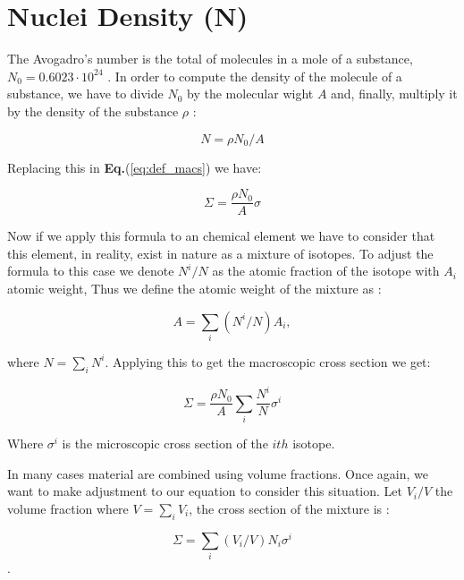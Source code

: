 \section{Nuclei Density (N)}

The Avogadro's number is the total of molecules in a mole of a substance, $N_0 = 0.6023 \cdot 10^24$ \cite{Lewis_2014}. In order to compute the  density of the molecule of a substance, we have to divide $N_0$ by the molecular wight \(A\) and, finally, multiply it by the density of the substance \(\rho\) \cite{Lewis_2014}:

\begin{equation*}
    N = \rho N_{0}/A
\end{equation*}

Replacing this in \textbf{Eq.}(\ref{eq:def_macs}) we have:

\begin{equation*}
    \Sigma = \frac{\rho N_{0}}{A}\sigma
\end{equation*}

Now if we apply this formula to an chemical element we have to consider that this element, in reality, exist in nature as a mixture of isotopes. To adjust the formula to this case we denote $N^{i}/N$ as the atomic fraction of the isotope with $A_i$ atomic weight, Thus we define the atomic weight of the mixture as \cite{Lewis_2014}:

\begin{equation*}
    A = \sum_{i} (N^{i}/N) A_{i} ,
\end{equation*}

where $N = \sum_{i}N^{i}$. Applying this to get the macroscopic cross section we get:

\begin{equation}
    \Sigma = \frac{\rho N_{0}}{A} \sum_{i}\frac{N^{i}}{N} \sigma^{i}
    \label{eq:chemical_mcs}
\end{equation}

Where $\sigma^{i}$ is the microscopic cross section of the \(ith\) isotope.

In many cases material are combined using volume fractions. Once again, we want to make adjustment to our equation to consider this situation. Let $V_{i}/V$ the volume fraction where $V = \sum_{i}V_{i}$, the cross section of the mixture is \cite{Lewis_2014}:

\begin{equation}
    \Sigma = \sum_{i}(V_{i}/V)N_{i}\sigma^{i}
    \label{eq:mcs_chemical_vf}
\end{equation}.

